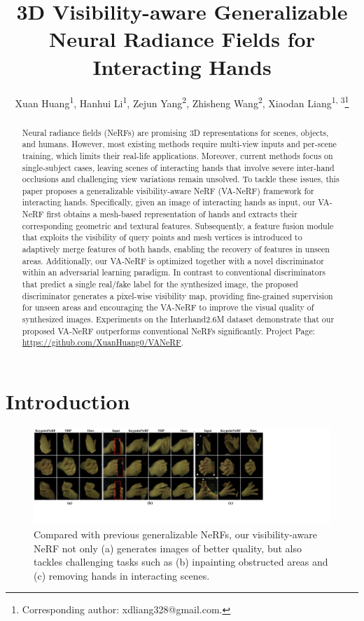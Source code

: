 \documentclass[letterpaper]{article} %
\title{3D Visibility-aware Generalizable Neural Radiance Fields for Interacting Hands}
\author{
    Xuan Huang\textsuperscript{\rm 1}\equalcontrib, Hanhui Li\textsuperscript{\rm 1}\equalcontrib, Zejun Yang\textsuperscript{\rm 2}, Zhisheng Wang\textsuperscript{\rm 2}, Xiaodan Liang\textsuperscript{\rm 1, \rm 3}\thanks{Corresponding author: xdliang328@gmail.com.}
}
\begin{document}
\maketitle

\begin{abstract}
Neural radiance fields (NeRFs) are promising 3D representations for scenes, objects, and humans. However, most existing methods require multi-view inputs and per-scene training, which limits their real-life applications. Moreover, current methods focus on single-subject cases, leaving scenes of interacting hands that involve severe inter-hand occlusions and challenging view variations remain unsolved. To tackle these issues, this paper proposes a generalizable visibility-aware NeRF (VA-NeRF) framework for interacting hands. Specifically, given an image of interacting hands as input, our VA-NeRF first obtains a mesh-based representation of hands and extracts their corresponding geometric and textural features. Subsequently, a feature fusion module that exploits the visibility of query points and mesh vertices is introduced to adaptively merge features of both hands, enabling the recovery of features in unseen areas. Additionally, our VA-NeRF is optimized together with a novel discriminator within an adversarial learning paradigm. In contrast to conventional discriminators that predict a single real/fake label for the synthesized image, the proposed discriminator generates a pixel-wise visibility map, providing fine-grained supervision for unseen areas and encouraging the VA-NeRF to improve the visual quality of synthesized images. Experiments on the Interhand2.6M dataset demonstrate that our proposed VA-NeRF outperforms conventional NeRFs significantly. Project Page: \url{https://github.com/XuanHuang0/VANeRF}.
\end{abstract}

\section{Introduction}

\begin{figure}[t]
  \centering
  \includegraphics[width=1.0\hsize]{figures/banner.pdf}
  \caption{Compared with previous generalizable NeRFs, our visibility-aware NeRF not only (a) generates images of better quality, but also tackles challenging tasks such as (b) inpainting obstructed areas and (c) removing hands in interacting scenes.}
  \label{fig:banner}
\end{figure}
\end{document}
